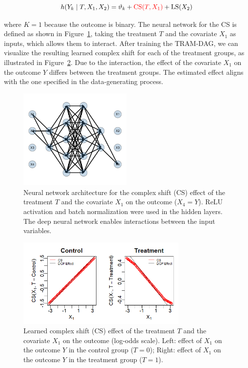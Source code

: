 \[
h(Y_k \mid T, X_1, X_2) = \vartheta_k + \textcolor{red}{\text{CS}(T, X_1)} + \text{LS}(X_2)
\]

where $K = 1$ because the outcome is binary. The neural network for the CS is defined as shown in Figure~\ref{fig:complex_shift_nn}, taking the treatment $T$ and the covariate $X_1$ as inputs, which allows them to interact. 
After training the TRAM-DAG, we can visualize the resulting learned complex shift for each of the treatment groups, as illustrated in Figure~\ref{fig:CS_interaction}. Due to the interaction, the effect of the covariate $X_1$ on the outcome $Y$ differs between the treatment groups. The estimated effect aligns with the one specified in the data-generating process.


\begin{figure}[htbp]
\centering
\includegraphics[width=0.5\textwidth]{img/appendix_CS_NN_interaction.pdf}
\caption{Neural network architecture for the complex shift (CS) effect of the treatment $T$ and the covariate $X_1$ on the outcome ($X_4=Y$). ReLU activation and batch normalization were used in the hidden layers. The deep neural network enables interactions between the input variables.}
\label{fig:complex_shift_nn}
\end{figure}


\begin{figure}[htbp]
\centering
\includegraphics[width=0.75\textwidth]{img/appendix_CS_T_X1_interaction.png}
\caption{Learned complex shift (CS) effect of the treatment $T$ and the covariate $X_1$ on the outcome (log-odds scale). Left: effect of $X_1$ on the outcome $Y$ in the control group ($T=0$); Right: effect of $X_1$ on the outcome $Y$ in the treatment group ($T=1$).}
\label{fig:CS_interaction}
\end{figure}


